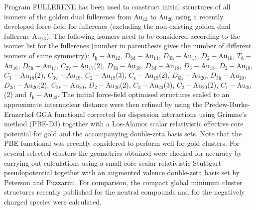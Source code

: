 Program FULLERENE\autocite{Schwerdtfeger_Programfullerenesoftware_2013} has
been used to construct initial structures of all isomers of the golden dual
fullerenes from Au$_{12}$ to Au$_{20}$ using a recently developed force-field
for fullerenes\autocite{Wirz_smallfullerenesgraphene_2015} (excluding the
non-existing golden dual fullerene Au$_{13}$). The following isomers need to be
considered according to the isomer list for the fullerenes (number in
parenthesis gives the number of different isomers of same
symmetry):\autocite{Brinkmann_HouseGraphsdatabase_2013,Schwerdtfeger_Programfullerenesoftware_2013}
$I_\mathrm{h}-$Au$_{12}$, $D_\mathrm{6d}-$Au$_{14}$, $D_\mathrm{3h}-$Au$_{15}$,
$D_\mathrm{2}-$Au$_{16}$, $T_\mathrm{d}-$Au$_{16}$, $D_\mathrm{5h}-$Au$_{17}$,
$C_\mathrm{2v}-$Au$_{17}$(2), $D_\mathrm{3h}-$Au$_{18}$,
$D_\mathrm{3d}-$Au$_{18}$, $D_\mathrm{3}-$Au$_{18}$, $D_\mathrm{2}-$Au$_{18}$,
$C_\mathrm{3}-$Au$_{18}$(2), $C_\mathrm{3v}-$Au$_{19}$,
$C_\mathrm{2}-$Au$_{19}$(3), $C_\mathrm{s}-$Au$_{19}$(2),
$D_\mathrm{6h}-$Au$_{20}$, $D_\mathrm{3h}-$Au$_{20}$,
$D_\mathrm{2d}-$Au$_{20}$(2), $C_\mathrm{2v}-$Au$_{20}$,
$D_\mathrm{2}-$Au$_{20}$(2), $C_\mathrm{2}-$Au$_{20}$(3),
$C_\mathrm{2}-$Au$_{20}$(2), $C_\mathrm{1}-$Au$_{20}$(2) and
$I_\mathrm{h}-$Au$_{32}$. The initial force-field optimised structures scaled
to an approximate internuclear distance were then refined by using the
Predew-Burke-Ernzerhof \ac{GGA}
functional\autocite{Perdew_GeneralizedGradientApproximation_1996,Perdew_GeneralizedGradientApproximation_1997}
corrected for dispersion interactions using Grimme's method
(PBE-D3)\autocite{Grimme_consistentaccurateinitio_2010,Grimme_Effectdampingfunction_2011}
together with a Los-Alamos scalar relativistic effective core potential for
gold and the accompanying double-zeta basis sets.\autocite{Wadt1985} Note that
the PBE functional was recently considered to perform well for gold
clusters.\autocite{Mancera_alternativemethodologyassess_2015} For several
selected clusters the geometries obtained were checked for accuracy by carrying
out calculations using a small core scalar relativistic Stuttgart
pseudopotential\autocite{Figgen_Energyconsistentpseudopotentialsgroup_2005}
together with an augmented valence double-zeta basis set by Peterson and
Puzzarini.\autocite{Peterson-2005} For comparison, the compact global minimum
cluster structures recently published for the neutral
compounds\autocite{Assadollahzadeh_systematicsearchminimum_2009} and for the
negatively charged
species\autocite{Schooss_Determiningsizedependentstructure_2010,Lechtken_Structuredeterminationgold_2009}
were calculated.

